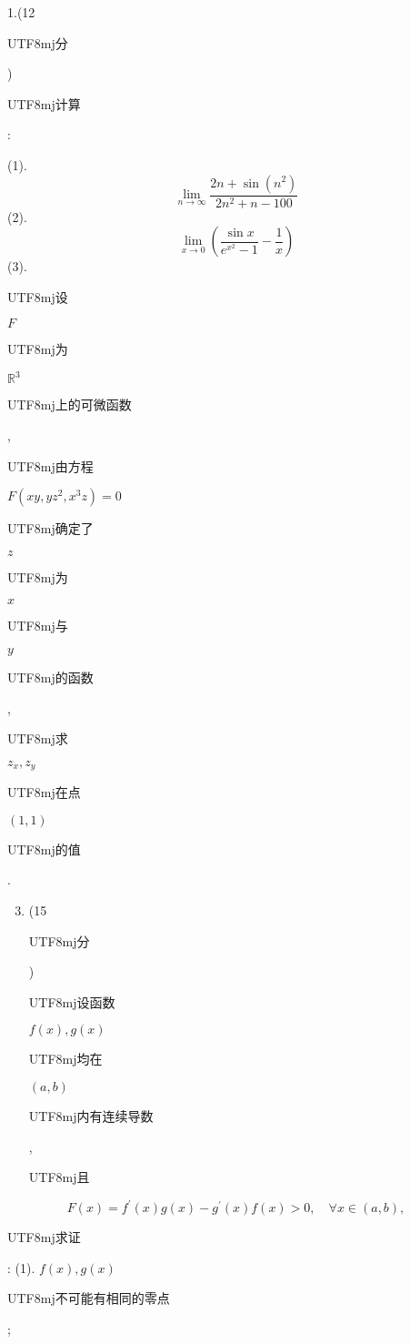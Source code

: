 \documentclass[10pt]{article}
\begin{document}
1.(12 \begin{CJK}{UTF8}{mj}分\end{CJK}) \begin{CJK}{UTF8}{mj}计算\end{CJK}:

(1).
$$
\lim _{n \rightarrow \infty} \frac{2 n+\sin \left(n^{2}\right)}{2 n^{2}+n-100}
$$
(2).
$$
\lim _{x \rightarrow 0}\left(\frac{\sin x}{e^{x^{2}}-1}-\frac{1}{x}\right)
$$
(3). \begin{CJK}{UTF8}{mj}设\end{CJK} $F$ \begin{CJK}{UTF8}{mj}为\end{CJK} $\mathbb{R}^{3}$ \begin{CJK}{UTF8}{mj}上的可微函数\end{CJK}, \begin{CJK}{UTF8}{mj}由方程\end{CJK} $F\left(x y, y z^{2}, x^{3} z\right)=0$ \begin{CJK}{UTF8}{mj}确定了\end{CJK} $z$ \begin{CJK}{UTF8}{mj}为\end{CJK} $x$ \begin{CJK}{UTF8}{mj}与\end{CJK} $y$ \begin{CJK}{UTF8}{mj}的函数\end{CJK}, \begin{CJK}{UTF8}{mj}求\end{CJK} $z_{x}, z_{y}$ \begin{CJK}{UTF8}{mj}在点\end{CJK} $(1,1)$ \begin{CJK}{UTF8}{mj}的值\end{CJK}.

\begin{enumerate}
  \setcounter{enumi}{2}
  \item (15 \begin{CJK}{UTF8}{mj}分\end{CJK}) \begin{CJK}{UTF8}{mj}设函数\end{CJK} $f(x), g(x)$ \begin{CJK}{UTF8}{mj}均在\end{CJK} $(a, b)$ \begin{CJK}{UTF8}{mj}内有连续导数\end{CJK}, \begin{CJK}{UTF8}{mj}且\end{CJK}
\end{enumerate}
$$
F(x)=f^{\prime}(x) g(x)-g^{\prime}(x) f(x)>0, \quad \forall x \in(a, b),
$$
\begin{CJK}{UTF8}{mj}求证\end{CJK}: (1). $f(x), g(x)$ \begin{CJK}{UTF8}{mj}不可能有相同的零点\end{CJK};
\end{document}
